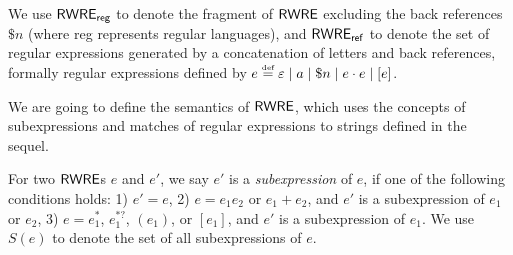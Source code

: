 We use ${\sf RWRE_{reg}}$ to denote the fragment of ${\sf RWRE}$ excluding the back references $\$ n$ (where {\sf reg} represents regular languages), and ${\sf RWRE_{ref}}$ to denote the set of regular expressions generated by a concatenation of letters and back references, formally regular expressions defined by $e \eqdef \varepsilon \mid a \mid \$n \mid e \concat e \mid [e]$.  
  
  

We are going to define the semantics of ${\sf RWRE}$, which uses the concepts of subexpressions and matches of regular expressions to strings defined in the sequel.
  
  
  	For two ${\sf RWRE}$s $e$ and $e'$, we say $e'$ is a \emph{subexpression} of $e$,
  	if one of the following conditions holds: 1) $e'=e$, 2) $e = e_1 e_2$ or $e_1 + e_2$, and $e'$ is a subexpression of $e_1$ or $e_2$, 3) $e = e_1^{\ast}$, $e_1^{\ast?}$, $(e_1)$, or $[e_1]$, and $e'$ is a subexpression of $e_1$. We use $S (e)$ to denote the set of all subexpressions of $e$.
  
